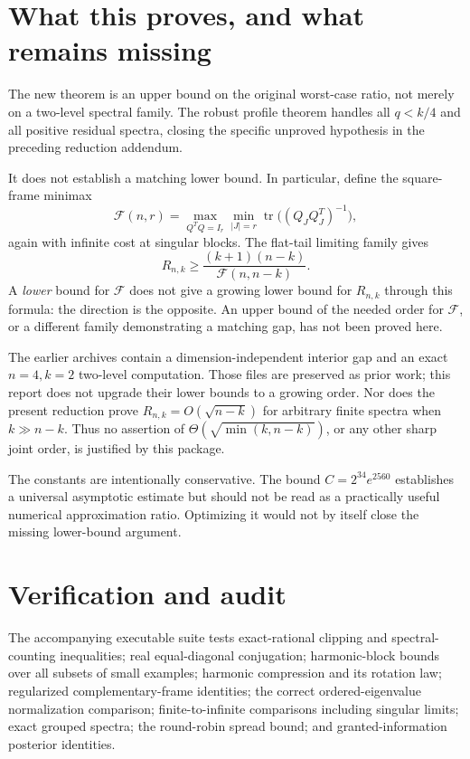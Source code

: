 \documentclass[11pt]{article}
\theoremstyle{remark}\newtheorem{remark}[theorem]{Remark}
\newcommand{\tr}{\operatorname{tr}}
\begin{document}
\section{What this proves, and what remains missing}
The new theorem is an upper bound on the original worst-case ratio, not merely on a two-level spectral family. The robust profile theorem handles all $q<k/4$ and all positive residual spectra, closing the specific unproved hypothesis in the preceding reduction addendum.

It does not establish a matching lower bound. In particular, define the square-frame minimax
\[
 \mathcal F(n,r)=\max_{Q^TQ=I_r}
 \min_{|J|=r}\tr\bigl((Q_JQ_J^T)^{-1}\bigr),
\]
again with infinite cost at singular blocks. The flat-tail limiting family gives
\[
 R_{n,k}\ge\frac{(k+1)(n-k)}{\mathcal F(n,n-k)}.
\]
A \emph{lower} bound for $\mathcal F$ does not give a growing lower bound for $R_{n,k}$ through this formula: the direction is the opposite. An upper bound of the needed order for $\mathcal F$, or a different family demonstrating a matching gap, has not been proved here.

The earlier archives contain a dimension-independent interior gap and an exact $n=4,k=2$ two-level computation. Those files are preserved as prior work; this report does not upgrade their lower bounds to a growing order. Nor does the present reduction prove $R_{n,k}=O(\sqrt{n-k})$ for arbitrary finite spectra when $k\gg n-k$. Thus no assertion of $\Theta(\sqrt{\min(k,n-k)})$, or any other sharp joint order, is justified by this package.

The constants are intentionally conservative. The bound $C=2^{34}e^{2560}$ establishes a universal asymptotic estimate but should not be read as a practically useful numerical approximation ratio. Optimizing it would not by itself close the missing lower-bound argument.

\section{Verification and audit}
The accompanying executable suite tests exact-rational clipping and spectral-counting inequalities; real equal-diagonal conjugation; harmonic-block bounds over all subsets of small examples; harmonic compression and its rotation law; regularized complementary-frame identities; the correct ordered-eigenvalue normalization comparison; finite-to-infinite comparisons including singular limits; exact grouped spectra; the round-robin spread bound; and granted-information posterior identities.
\end{document}
